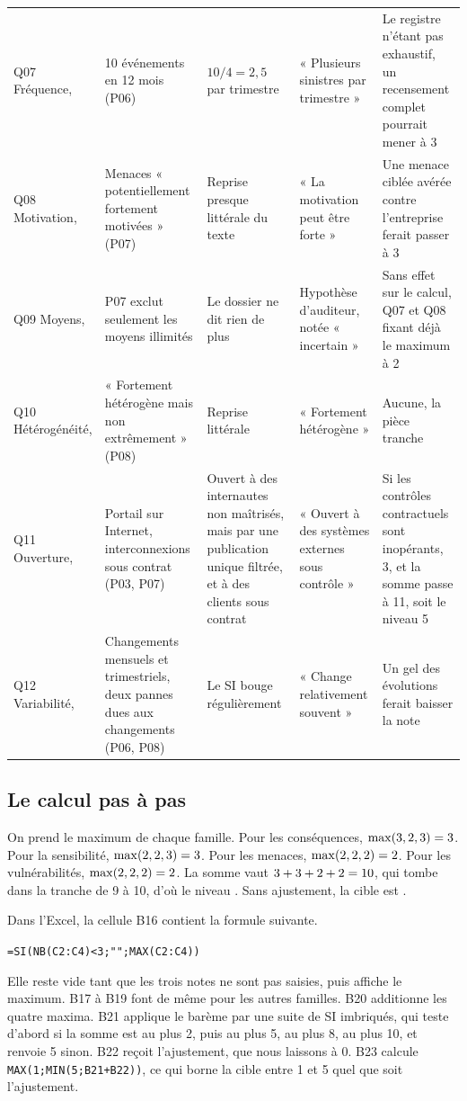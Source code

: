 \documentclass[11pt,a4paper]{article}
\begin{document}
{\begin{longtable}{@{}L{1.6cm} L{3.4cm} L{3.4cm} L{3.4cm} L{3.3cm}@{}}
Q07 Fréquence, \textbf{} & 10 événements en 12 mois (P06) & $10 / 4 = 2{,}5$ par trimestre & « Plusieurs sinistres par trimestre » & Le registre n'étant pas exhaustif, un recensement complet pourrait mener à 3 \\
Q08 Motivation, \textbf{} & Menaces « potentiellement fortement motivées » (P07) & Reprise presque littérale du texte & « La motivation peut être forte » & Une menace ciblée avérée contre l'entreprise ferait passer à 3 \\
Q09 Moyens, \textbf{} & P07 exclut seulement les moyens illimités & Le dossier ne dit rien de plus & Hypothèse d'auditeur, notée « incertain » & Sans effet sur le calcul, Q07 et Q08 fixant déjà le maximum à 2 \\
Q10 Hétérogénéité, \textbf{} & « Fortement hétérogène mais non extrêmement » (P08) & Reprise littérale & « Fortement hétérogène » & Aucune, la pièce tranche \\
Q11 Ouverture, \textbf{} & Portail sur Internet, interconnexions sous contrat (P03, P07) & Ouvert à des internautes non maîtrisés, mais par une publication unique filtrée, et à des clients sous contrat & « Ouvert à des systèmes externes sous contrôle » & Si les contrôles contractuels sont inopérants, 3, et la somme passe à 11, soit le niveau 5 \\
Q12 Variabilité, \textbf{} & Changements mensuels et trimestriels, deux pannes dues aux changements (P06, P08) & Le SI bouge régulièrement & « Change relativement souvent » & Un gel des évolutions ferait baisser la note \\
\end{longtable}}

\subsection{Le calcul pas à pas}

On prend le maximum de chaque famille. Pour les conséquences, $\max(3, 2, 3) = 3$. Pour la sensibilité, $\max(2, 2, 3) = 3$. Pour les menaces, $\max(2, 2, 2) = 2$. Pour les vulnérabilités, $\max(2, 2, 2) = 2$. La somme vaut $3 + 3 + 2 + 2 = 10$, qui tombe dans la tranche de 9 à 10, d'où le niveau \NiveauCalcule. Sans ajustement, la cible est \Cible.

Dans l'Excel, la cellule B16 contient la formule suivante.
\begin{center}\texttt{=SI(NB(C2:C4)<3;"";MAX(C2:C4))}\end{center}
Elle reste vide tant que les trois notes ne sont pas saisies, puis affiche le maximum. B17 à B19 font de même pour les autres familles. B20 additionne les quatre maxima. B21 applique le barème par une suite de SI imbriqués, qui teste d'abord si la somme est au plus 2, puis au plus 5, au plus 8, au plus 10, et renvoie 5 sinon. B22 reçoit l'ajustement, que nous laissons à 0. B23 calcule \texttt{MAX(1;MIN(5;B21+B22))}, ce qui borne la cible entre 1 et 5 quel que soit l'ajustement.
\end{document}
